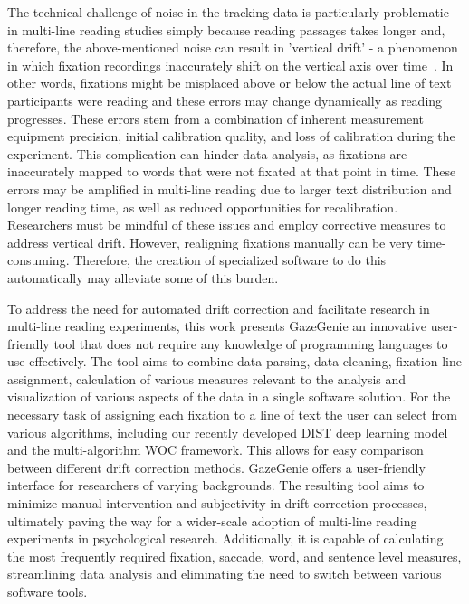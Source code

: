 \documentclass[twocolumn]{article}
\begin{document}
The technical challenge of noise in the tracking data is particularly problematic in multi-line reading studies simply because reading passages takes longer and, therefore, the above-mentioned noise can result in 'vertical drift' - a phenomenon in which fixation recordings inaccurately shift on the vertical axis over time~\cite{limasanchesVerticalErrorCorrection2016}. In other words, fixations might be misplaced above or below the actual line of text participants were reading and these errors may change dynamically as reading progresses. These errors stem from a combination of inherent measurement equipment precision, initial calibration quality, and loss of calibration during the experiment. This complication can hinder data analysis, as fixations are inaccurately mapped to words that were not fixated at that point in time. These errors may be amplified in multi-line reading due to larger text distribution and longer reading time, as well as reduced opportunities for recalibration. Researchers must be mindful of these issues and employ corrective measures to address vertical drift. However, realigning fixations manually can be very time-consuming. Therefore, the creation of specialized software to do this automatically may alleviate some of this burden.

To address the need for automated drift correction and facilitate research in multi-line reading experiments, this work presents GazeGenie an innovative user-friendly tool that does not require any knowledge of programming languages to use effectively. The tool aims to combine data-parsing, data-cleaning, fixation line assignment, calculation of various measures relevant to the analysis and visualization of various aspects of the data in a single software solution. For the necessary task of assigning each fixation to a line of text the user can select from various algorithms, including our recently developed DIST deep learning model~\cite{mercierDualInputStream2024a} and the multi-algorithm WOC framework. This allows for easy comparison between different drift correction methods. GazeGenie offers a user-friendly interface for researchers of varying backgrounds. The resulting tool aims to minimize manual intervention and subjectivity in drift correction processes, ultimately paving the way for a wider-scale adoption of multi-line reading experiments in psychological research. Additionally, it is capable of calculating the most frequently required fixation, saccade, word, and sentence level measures, streamlining data analysis and eliminating the need to switch between various software tools.
\end{document}
